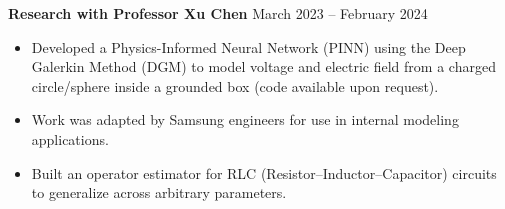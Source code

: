 \documentclass[letterpaper,10pt]{article}
\begin{document}
\textbf{Research with Professor Xu Chen} \hfill March 2023 -- February 2024\vspace{-5pt}
\begin{itemize}[itemsep=-5pt, parsep=5pt, leftmargin=0.25in]
    \item Developed a Physics-Informed Neural Network (PINN) using the Deep Galerkin Method (DGM) to model voltage and electric field from a charged circle/sphere inside a grounded box (code available upon request).
    \item Work was adapted by Samsung engineers for use in internal modeling applications.
    \item Built an operator estimator for RLC (Resistor–Inductor–Capacitor) circuits to generalize across arbitrary parameters.
\end{itemize}




\end{document}
